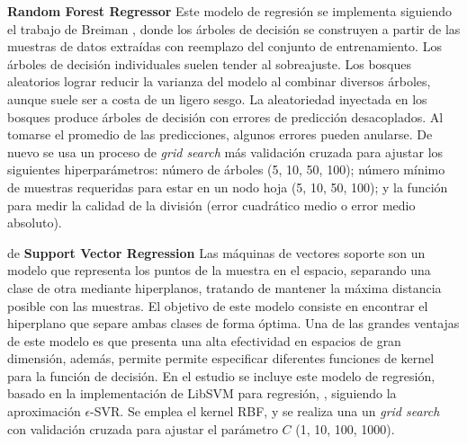 \vspace{0.5cm}

\textbf{Random Forest Regressor} {} Este modelo de regresión se implementa siguiendo el trabajo de Breiman \cite{Breiman2001}, donde los árboles de decisión se construyen a partir de las muestras de datos extraídas con reemplazo del conjunto de entrenamiento. Los árboles de decisión individuales suelen tender al sobreajuste. Los bosques aleatorios lograr reducir la varianza del modelo al combinar diversos árboles, aunque suele ser a costa de un ligero sesgo. La aleatoriedad inyectada en los bosques produce árboles de decisión con errores de predicción desacoplados. Al tomarse el promedio de las predicciones, algunos errores pueden anularse. %
De nuevo se usa un proceso de \emph{grid search} más validación cruzada para ajustar los siguientes hiperparámetros: número de árboles (5, 10, 50, 100); número mínimo de muestras requeridas para estar en un nodo hoja (5, 10, 50, 100); y la función para medir la calidad de la división (error cuadrático medio o error medio absoluto).

\vspace{0.5cm}
de
\textbf{Support Vector Regression} {} Las máquinas de vectores soporte son un modelo que representa los puntos de la muestra en el espacio, separando una clase de otra mediante hiperplanos, tratando de mantener la máxima distancia posible con las muestras. El objetivo de este modelo consiste en encontrar el hiperplano que separe ambas clases de forma óptima. Una de las grandes ventajas de este modelo es que presenta una alta efectividad en espacios de gran dimensión, además, permite permite especificar diferentes funciones de kernel para la función de decisión. En el estudio se incluye este modelo de regresión, basado en la implementación de LibSVM para regresión, \cite{LIBSVM}, siguiendo la aproximación $\epsilon$-SVR. %
Se emplea el kernel RBF, y se realiza una un \emph{grid search} con validación cruzada para ajustar el parámetro $C$ (1, 10, 100, 1000).

\vspace{0.5cm}

